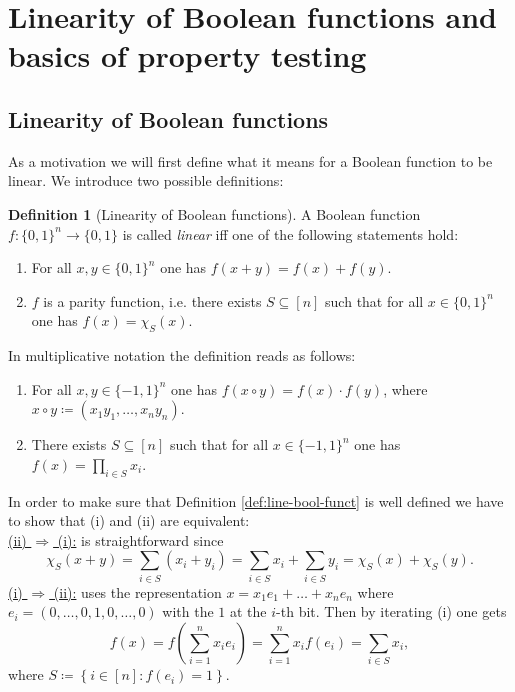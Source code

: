 \documentclass[a4paper]{article}
\newcommand{\nset}{[n]}
\theoremstyle{plain}
\theoremstyle{definition}
\newtheorem{definition}{Definition}
\theoremstyle{remark}
\begin{document}
\section{Linearity of Boolean functions and basics of property testing}
\label{sec:line-bool-funct}

\subsection{Linearity of Boolean functions}
\label{sec:line-bool-funct-1}

As a motivation we will first define what it means for a Boolean
function to be linear. We introduce two possible definitions: 

\begin{definition}[Linearity of Boolean functions] \label{def:1}
  A Boolean function \(f: \{0,1\}^n \rightarrow \{0,1\}\) is called \emph{linear}
  iff one of the following statements hold: 
  \begin{enumerate}[label= (\roman*)]
  \item For all \(x,y \in \{0,1\}^n\) one has \(f(x+y) = f(x) + f(y)\).
  \item \(f\) is a parity function, i.e. there exists \(S \subseteq
    \nset\) such that for all \(x \in \{0,1\}^n\) one has \(f(x) =
    \chi_S(x)\). 
  \end{enumerate}
\end{definition}

\noindent In multiplicative notation the definition reads as follows: 
\begin{enumerate}[label= (\roman*)]
\item For all \(x,y \in \{-1,1\}^n\) one has \(f(x\circ y) = f(x)\cdot
  f(y)\), where \(x\circ y \coloneqq (x_1y_1, \dots, x_ny_n)\).
\item There exists \(S \subseteq \nset\) such that for all \(x\in
  \{-1,1\}^n\) one has \(f(x) = \prod_{i\in S} x_i\). 
\end{enumerate}

\noindent In order to make sure that Definition
\ref{def:line-bool-funct} is well defined we have to show that (i) and
(ii) are equivalent: \\
\underline{(ii) \(\Rightarrow\) (i):} is straightforward since 
\[\chi_S(x+y) = \sum_{i\in S} (x_i + y_i) = \sum_{i\in S} x_i +
\sum_{i\in S} y_i = \chi_S(x) + \chi_S(y).\]
\underline{(i) \(\Rightarrow\) (ii):} uses the representation \(x =
x_1 e_1 + \dots + x_n e_n\) where \(e_i = (0,\dots,0,1,0,\dots,0)\)
with the \(1\) at the \(i\)-th bit. Then by iterating (i) one gets
\[f(x) = f\left(\sum_{i=1}^{n} x_i e_i\right) = \sum_{i=1}^{n} x_i f(e_i) =
\sum_{i\in S} x_i, \]
where \(S \coloneqq \left\{i\in \nset : f(e_i) = 1 \right\}\). \\
\end{document}
